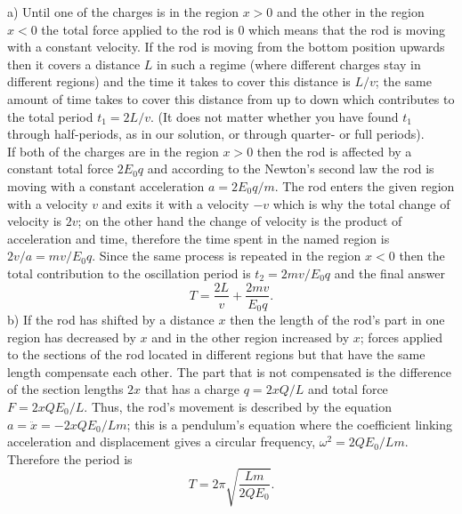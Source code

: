 \solueng
a) Until one of the charges is in the region $x>0$ and the other in the region $x<0$ the total force applied to the rod is 0 which means that the rod is moving with a constant velocity. If the rod is moving from the bottom position upwards then it covers a distance $L$ in such a regime (where different charges stay in different regions) and the time it takes to cover this distance is $L/v$; the same amount of time takes to cover this distance from up to down which contributes to the total period $t_1=2L/v$. (It does not matter whether you have found $t_1$ through half-periods, as in our solution, or through quarter- or full periods).\\
If both of the charges are in the region $x> 0$ then the rod is affected by a constant total force $2E_0q$ and according to the Newton’s second law the rod is moving with a constant acceleration $a=2E_0q/m$. The rod enters the given region with a velocity $v$ and exits it with a velocity $-v$ which is why the total change of velocity is $2v$; on the other hand the change of velocity is the product of acceleration and time, therefore the time spent in the named region is $2v/a=mv/E_0q$. Since the same process is repeated in the region $x<0$ then the total contribution to the oscillation period is $t_2=2mv/E_0q$ and the final answer 
\[ T=\frac{2L}v+\frac {2mv}{E_0q}. \] 
b) If the rod has shifted by a distance $x$ then the length of the rod’s part in one region has decreased by $x$ and in the other region increased by $x$; forces applied to the sections of the rod located in different regions but that have the same length compensate each other. The part that is not compensated is the difference of the section lengths $2x$ that has a charge $q=2xQ/L$ and total force $F=2xQE_0/L$. Thus, the rod’s movement is described by the equation $a=\ddot x= -2xQE_0/Lm$; this is a pendulum’s equation where the coefficient linking acceleration and displacement gives a circular frequency, $\omega^2=2QE_0/Lm$. Therefore the period is
\[ T=2\pi\sqrt{\frac{Lm}{2QE_0}}.\]
\probend
